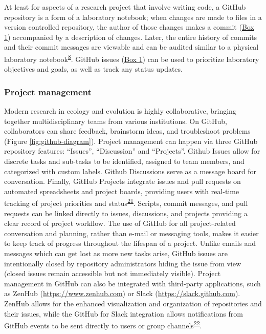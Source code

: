 At least for aspects of a research project that involve writing code, a GitHub repository is a form of a laboratory notebook; when changes are made to files in a version controlled repository, the author of those changes makes a commit (\protect\hyperlink{definitions}{Box 1}) accompanied by a description of changes.
Later, the entire history of commits and their commit messages are viewable and can be audited similar to a physical laboratory notebook\textsuperscript{\protect\hyperlink{ref-4ny1onB0}{8}}.
GitHub issues (\protect\hyperlink{definitions}{Box 1}) can be used to prioritize laboratory objectives and goals, as well as track any status updates.

\hypertarget{project-management}{%
\subsubsection{Project management}\label{project-management}}

Modern research in ecology and evolution is highly collaborative, bringing together multidisciplinary teams from various institutions.
On GitHub, collaborators can share feedback, brainstorm ideas, and troubleshoot problems (Figure \ref{fig:github-diagram}).
Project management can happen via three GitHub repository features: ``Issues'', ``Discussion'' and ``Projects''.
Github Issues allow for discrete tasks and sub-tasks to be identified, assigned to team members, and categorized with custom labels.
Github Discussions serve as a message board for conversation.
Finally, GitHub Projects integrate issues and pull requests on automated spreadsheets and project boards, providing users with real-time tracking of project priorities and status\textsuperscript{\protect\hyperlink{ref-RhBKe0MG}{21}}.
Scripts, commit messages, and pull requests can be linked directly to issues, discussions, and projects providing a clear record of project workflow.
The use of GitHub for all project-related conversation and planning, rather than e-mail or messaging tools, makes it easier to keep track of progress throughout the lifespan of a project.
Unlike emails and messages which can get lost as more new tasks arise, GitHub issues are intentionally closed by repository administrators hiding the issue from view (closed issues remain accessible but not immediately visible).
Project management in GitHub can also be integrated with third-party applications, such as ZenHub (\url{https://www.zenhub.com}) or Slack (\url{https://slack.github.com}).
ZenHub allows for the enhanced visualization and organization of repositories and their issues, while the GitHub for Slack integration allows notifications from GitHub events to be sent directly to users or group channels\textsuperscript{\protect\hyperlink{ref-1GRWGlDWy}{22}}.

